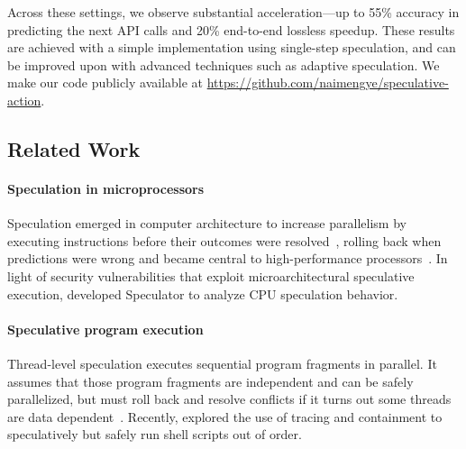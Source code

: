 \documentclass{article} %
\theoremstyle{plain} %
\theoremstyle{definition} %
\theoremstyle{remark} %
\begin{document}
Across these settings, we observe substantial acceleration---up to 55\% accuracy in predicting the next API calls and 20\% end-to-end lossless speedup. These results are achieved with a simple implementation using single-step speculation, and can be improved upon with advanced techniques such as adaptive speculation. We make our code publicly available at \url{https://github.com/naimengye/speculative-action}.


\subsection{Related Work}
\label{sec:related}

\paragraph{Speculation in microprocessors}
Speculation emerged in computer architecture to increase parallelism
by executing instructions before their outcomes were resolved~\citep{tomasulo1967efficient}, 
rolling back when predictions were wrong and became central to high-performance processors~\citep{lam1992limits}. In light of security vulnerabilities that exploit microarchitectural speculative execution, \citep{mambretti2019speculator} developed Speculator to analyze CPU speculation behavior. 

\paragraph{Speculative program execution} Thread-level speculation executes sequential program fragments in parallel. It assumes that those program fragments are independent and can be safely parallelized, but must roll back and resolve conflicts if it turns out some threads are data dependent~\citep{10.1145/2938369}. Recently, \citep{liargkovas2023shell} explored the use of tracing and containment to speculatively but safely run shell scripts out of order.
\end{document}
